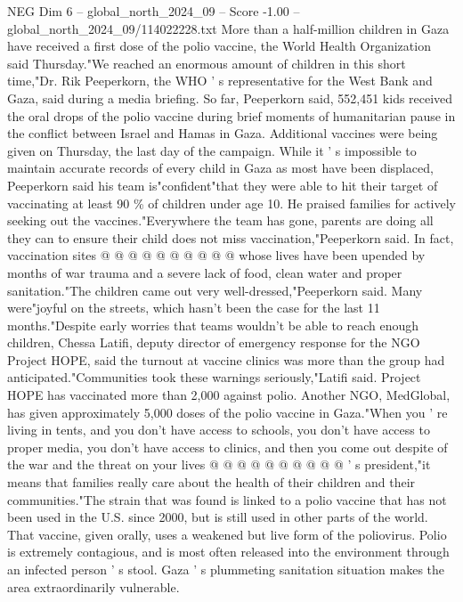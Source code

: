 \begin{textsample}{NEG Dim 6 – global\_north\_2024\_09 – Score -1.00 – global\_north\_2024\_09/114022228.txt}  \label{ex:f6_neg_091}
More than a half-million children in Gaza have received a first dose of the polio vaccine, the World Health Organization said Thursday."We reached an enormous amount of children in this short time,"Dr.
Rik Peeperkorn, the WHO ' s representative for the West Bank and Gaza, said during a media briefing.
So far, Peeperkorn said, 552,451 kids received the oral drops of the polio vaccine during brief moments of humanitarian pause in the conflict between Israel and Hamas in Gaza.
Additional vaccines were being given on Thursday, the last day of the campaign.
While it ' s impossible to maintain accurate records of every child in Gaza as most have been displaced, Peeperkorn said his team is"confident"that they were able to hit their target of vaccinating at least 90 \% of children under age 10.
He praised families for actively seeking out the vaccines."Everywhere the team has gone, parents are doing all they can to ensure their child does not miss vaccination,"Peeperkorn said.
In fact, vaccination sites @ @ @ @ @ @ @ @ @ @ whose lives have been upended by months of war trauma and a severe lack of food, clean water and proper sanitation."The children came out very well-dressed,"Peeperkorn said.
Many were"joyful on the streets, which hasn't been the case for the last 11 months."Despite early worries that teams wouldn't be able to reach enough children, Chessa Latifi, deputy director of emergency response for the NGO Project HOPE, said the turnout at vaccine clinics was more than the group had anticipated."Communities took these warnings seriously,"Latifi said.
Project HOPE has vaccinated more than 2,000 against polio.
Another NGO, MedGlobal, has given approximately 5,000 doses of the polio vaccine in Gaza."When you ' re living in tents, and you don't have access to schools, you don't have access to proper media, you don't have access to clinics, and then you come out despite of the war and the threat on your lives @ @ @ @ @ @ @ @ @ @ ' s president,"it means that families really care about the health of their children and their communities."The strain that was found is linked to a polio vaccine that has not been used in the U.S. since 2000, but is still used in other parts of the world.
That vaccine, given orally, uses a weakened but live form of the poliovirus.
Polio is extremely contagious, and is most often released into the environment through an infected person ' s stool.
Gaza ' s plummeting sanitation situation makes the area extraordinarily vulnerable.

\end{textsample}
